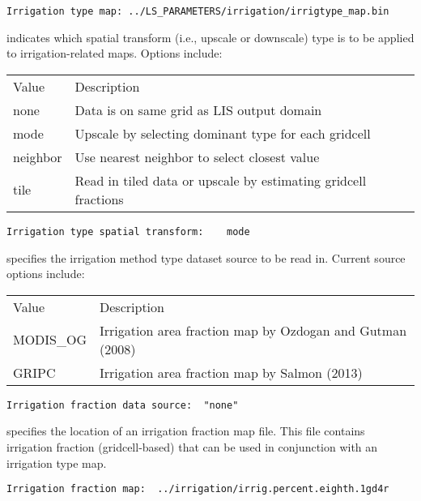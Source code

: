  \begin{Verbatim}[frame=single]
Irrigation type map: ../LS_PARAMETERS/irrigation/irrigtype_map.bin
 \end{Verbatim}

 
  indicates which spatial transform
 (i.e., upscale or downscale) type is to be applied to
 irrigation-related maps.  Options include:

 \begin{tabular}{ll}
 Value   & Description                                   \\
 none    & Data is on same grid as LIS output domain            \\
 mode    & Upscale by selecting dominant type for each gridcell \\
 neighbor &  Use nearest neighbor to select closest value  \\
 tile    & Read in tiled data or upscale by estimating gridcell fractions\\
 \end{tabular}
 

 \begin{Verbatim}[frame=single]
Irrigation type spatial transform:    mode
 \end{Verbatim}

 
  specifies the irrigation method type 
 dataset source to be read in.
 Current source options include:

 \begin{tabular}{ll}
 Value       & Description               \\
 MODIS\_OG   & Irrigation area fraction map by Ozdogan and Gutman (2008) \\
 GRIPC       & Irrigation area fraction map by Salmon (2013) \\
 \end{tabular}
 

 \begin{Verbatim}[frame=single]
Irrigation fraction data source:  "none"
 \end{Verbatim}

 
  specifies the location of an
 irrigation fraction map file.
 This file contains irrigation fraction (gridcell-based) that
 can be used in conjunction with an irrigation type map.
 

 \begin{Verbatim}[frame=single]
Irrigation fraction map:  ../irrigation/irrig.percent.eighth.1gd4r
 \end{Verbatim}

